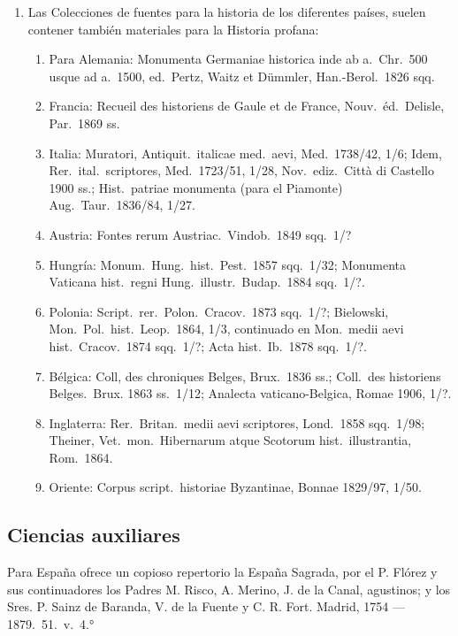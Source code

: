 \raggedbottom{} \documentclass[12pt, a4paper]{book}
\begin{document}
\begin{enumerate}
\begin{enumerate}
        \end{enumerate}
  \item Las Colecciones de fuentes para la historia de los diferentes países, suelen contener también materiales para la Historia profana:\begin{enumerate}
          \item Para Alemania: Monumenta Germaniae historica inde ab a.\ Chr.\ 500 usque ad a.\ 1500, ed.\ Pertz, Waitz et Dümmler, Han.-Berol.\ 1826 sqq.
          \item Francia: Recueil des historiens de Gaule et de France, Nouv.\ éd.\ Delisle, Par.\ 1869 ss.
          \item Italia: Muratori, Antiquit.\ italicae med.\ aevi, Med.\ 1738/42, 1/6; Idem, Rer.\ ital.\ scriptores, Med.\ 1723/51, 1/28, Nov.\ ediz.\ Città di Castello 1900 ss.; Hist.\ patriae monumenta (para el Piamonte) Aug.\ Taur.\ 1836/84, 1/27.
          \item Austria: Fontes rerum Austriac.\ Vindob.\ 1849 sqq.\ 1/?
          \item Hungría: Monum.\ Hung.\ hist.\ Pest.\ 1857 sqq.\ 1/32; Monumenta Vaticana hist.\ regni Hung.\ illustr.\ Budap.\ 1884 sqq.\ 1/?.
          \item Polonia: Script.\ rer.\ Polon.\ Cracov.\ 1873 sqq.\ 1/?; Bielowski, Mon.\ Pol.\ hist.\ Leop.\ 1864, 1/3, continuado en Mon.\ medii aevi hist.\ Cracov.\ 1874 sqq.\ 1/?; Acta hist.\ Ib.\ 1878 sqq.\ 1/?.
          \item Bélgica: Coll, des chroniques Belges, Brux.\ 1836 ss.; Coll.\ des historiens Belges.\ Brux. 1863 ss.\ 1/12; Analecta vaticano-Belgica, Romae 1906, 1/?.
          \item Inglaterra: Rer.\ Britan.\ medii aevi scriptores, Lond.\ 1858 sqq.\ 1/98; Theiner, Vet.\ mon.\ Hibernarum atque Scotorum hist.\ illustrantia, Rom.\ 1864.
          \item Oriente: Corpus script.\ historiae Byzantinae, Bonnae 1829/97, 1/50.
        \end{enumerate}
\end{enumerate}

\subsection{Ciencias auxiliares} Para España ofrece un copioso repertorio la España Sagrada, por el P. Flórez y sus continuadores los Padres M. Risco, A. Merino, J. de la Canal, agustinos; y los Sres. P. Sainz de Baranda, V. de la Fuente y C. R. Fort. Madrid, 1754 --- 1879.\ 51.\ v.\ 4.°
\end{document}

